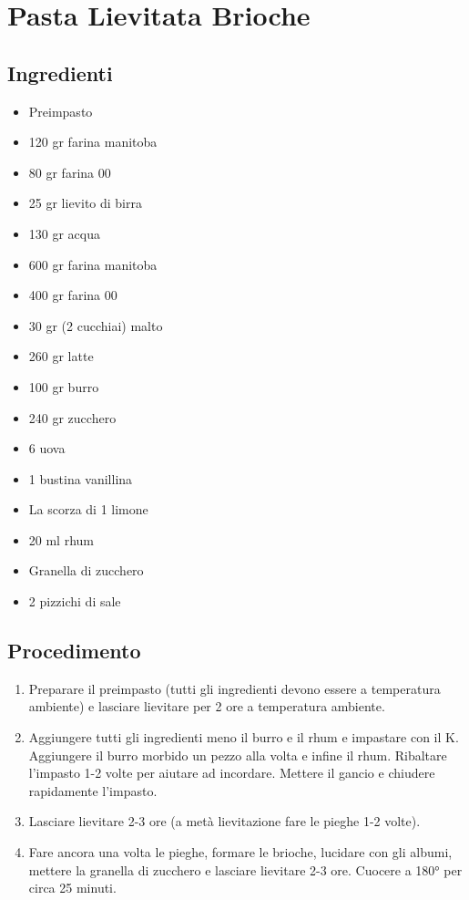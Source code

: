 \section{Pasta Lievitata Brioche}
\subsection{Ingredienti}
\begin{itemize}
\item Preimpasto  
\item 120 gr farina manitoba  
\item 80 gr farina 00  
\item 25 gr lievito di birra  
\item 130 gr acqua   
\item 600 gr farina manitoba  
\item 400 gr farina 00  
\item 30 gr (2 cucchiai) malto  
\item 260 gr latte  
\item 100 gr burro  
\item 240 gr zucchero  
\item 6 uova  
\item 1 bustina vanillina  
\item La scorza di 1 limone  
\item 20 ml rhum  
\item Granella di zucchero  
\item 2 pizzichi di sale
\end{itemize}
\subsection{Procedimento}
\begin{enumerate}
\item  Preparare il preimpasto (tutti gli ingredienti devono essere a temperatura ambiente) e lasciare lievitare per 2 ore a temperatura ambiente.  
\item  Aggiungere tutti gli ingredienti meno il burro e il rhum e impastare con il K. Aggiungere il burro morbido un pezzo alla volta e infine il rhum. Ribaltare l'impasto 1-2 volte per aiutare ad incordare. Mettere il gancio e chiudere rapidamente l'impasto.  
\item  Lasciare lievitare 2-3 ore (a metà lievitazione fare le pieghe 1-2 volte).   
\item  Fare ancora una volta le pieghe, formare le brioche, lucidare con gli albumi, mettere la granella di zucchero e lasciare lievitare 2-3 ore. Cuocere a 180° per circa 25 minuti.
\end{enumerate}
